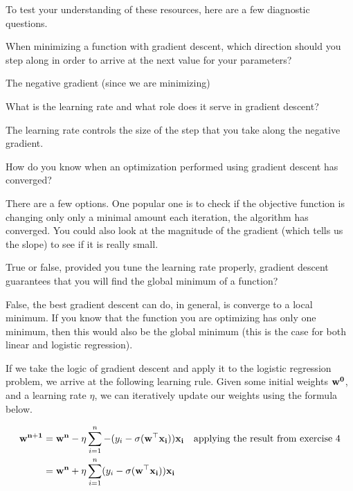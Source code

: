 \documentclass[assignment03_Solutions]{subfiles}
\begin{document}
\begin{exercise}[(10 minutes)]
To test your understanding of these resources, here are a few diagnostic questions.
\bes
\item When minimizing a function with gradient descent, which direction should you step along in order to arrive at the next value for your parameters?
\begin{boxedsolution}
The negative gradient (since we are minimizing)
\end{boxedsolution}

\item What is the learning rate and what role does it serve in gradient descent?
\begin{boxedsolution}
The learning rate controls the size of the step that you take along the negative gradient.
\end{boxedsolution}

\item How do you know when an optimization performed using gradient descent has converged?
\begin{boxedsolution}
There are a few options.  One popular one is to check if the objective function is changing only only a minimal amount each iteration, the algorithm has converged.  You could also look at the magnitude of the gradient (which tells us the slope) to see if it is really small.
\end{boxedsolution}

\item True or false, provided you tune the learning rate properly, gradient descent guarantees that you will find the global minimum of a function?
\begin{boxedsolution}
False, the best gradient descent can do, in general, is converge to a local minimum.  If you know that the function you are optimizing has only one minimum, then this would also be the global minimum (this is the case for both linear and logistic regression).
\end{boxedsolution}
\ees
\end{exercise}

If we take the logic of gradient descent and apply it to the logistic regression problem, we arrive at the following learning rule.  Given some initial weights $\mathbf{w^0}$, and a learning rate $\eta$, we can iteratively update our weights using the formula below.

\begin{align}
\mathbf{w^{n+1}} &= \mathbf{w^n} - \eta \sum_{i=1}^n  -(y_i - \sigma(\mathbf{w}^\top \mathbf{x_i})) \mathbf{x_i} ~~~\mbox{applying the result from exercise 4} \\
&=  \mathbf{w^n} + \eta \sum_{i=1}^n  (y_i - \sigma(\mathbf{w}^\top \mathbf{x_i})) \mathbf{x_i} 
\end{align}
\end{document}
